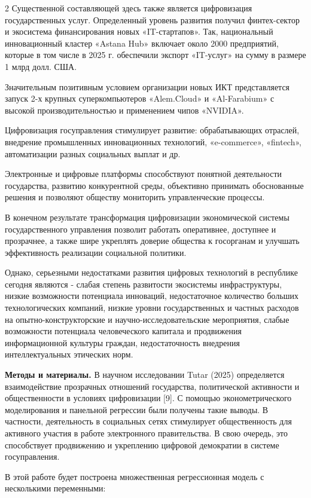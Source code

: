 \begin{multicols}{2}
Существенной составляющей здесь также является цифровизация
государственных услуг. Определенный уровень развития получил
финтех-сектор и экосистема финансирования новых «IT-стартапов». Так,
национальный инновационный кластер «Astana Hub» включает около 2000
предприятий, которые в том числе в 2025 г. обеспечили экспорт «IT-услуг»
на сумму в размере 1 млрд долл. США.

Значительным позитивным условием организации новых ИКТ представляется
запуск 2-х крупных суперкомпьютеров «Alem.Cloud» и «Al-Farabium» с
высокой производительностью и применением чипов «NVIDIA».

Цифровизация госуправления стимулирует развитие: обрабатывающих
отраслей, внедрение промышленных инновационных технологий, «e-commerce»,
«fintech», автоматизации разных социальных выплат и др.

Электронные и цифровые платформы способствуют понятной деятельности
государства, развитию конкурентной среды, объективно принимать
обоснованные решения и позволяют обществу мониторить управленческие
процессы.

В конечном результате трансформация цифровизации экономической системы
государственного управления позволит работать оперативнее, доступнее и
прозрачнее, а также шире укреплять доверие общества к госорганам и
улучшать эффективность реализации социальной политики.

Однако, серьезными недостатками развития цифровых технологий в
республике сегодня являются - слабая степень развитости экосистемы
инфраструктуры, низкие возможности потенциала инноваций, недостаточное
количество больших технологических компаний, низкие уровни
государственных и частных расходов на опытно-конструкторские и
научно-исследовательские мероприятия, слабые возможности потенциала
человеческого капитала и продвижения информационной культуры граждан,
недостаточность внедрения интеллектуальных этических норм.

{\bfseries Методы и материалы.} В научном исследовании Tutar
(2025) определяется взаимодействие прозрачных отношений
государства, политической активности и общественности в условиях
цифровизации {[}9{]}. С помощью эконометрического моделирования и
панельной регрессии были получены такие выводы. В частности,
деятельность в социальных сетях стимулирует общественность для активного
участия в работе электронного правительства. В свою очередь, это
способствует продвижению и укреплению цифровой демократии в системе
госуправления.

В этой работе будет построена множественная регрессионная модель с
несколькими переменными:


\end{multicols}
